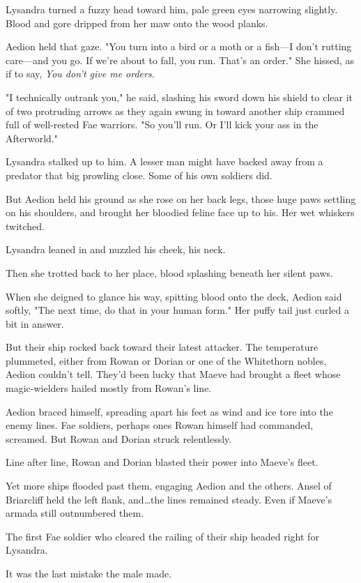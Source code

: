 Lysandra turned a fuzzy head toward him, pale green eyes narrowing slightly.
Blood and gore dripped from her maw onto the wood planks.

Aedion held that gaze.
"You turn into a bird or a moth or a fish---I don't rutting care---and you go.
If we're about to fall, you run.
That's an order."
She hissed, as if to say, \emph{You don't give me orders}.

"I technically outrank you," he said, slashing his sword down his shield to clear it of two protruding arrows as they again swung in toward another ship crammed full of well-rested Fae warriors.
"So you'll run.
Or I'll kick your ass in the Afterworld."

Lysandra stalked up to him.
A lesser man might have backed away from a predator that big prowling close.
Some of his own soldiers did.

But Aedion held his ground as she rose on her back legs, those huge paws settling on his shoulders, and brought her bloodied feline face up to his.
Her wet whiskers twitched.

Lysandra leaned in and nuzzled his cheek, his neck.

Then she trotted back to her place, blood splashing beneath her silent paws.

When she deigned to glance his way, spitting blood onto the deck, Aedion said softly, "The next time, do that in your human form."
Her puffy tail just curled a bit in answer.

But their ship rocked back toward their latest attacker.
The temperature plummeted, either from Rowan or Dorian or one of the Whitethorn nobles, Aedion couldn't tell.
They'd been lucky that Maeve had brought a fleet whose magic-wielders hailed mostly from Rowan's line.

Aedion braced himself, spreading apart his feet as wind and ice tore into the enemy lines.
Fae soldiers, perhaps ones Rowan himself had commanded, screamed.
But Rowan and Dorian struck relentlessly.

Line after line, Rowan and Dorian blasted their power into Maeve's fleet.

Yet more ships flooded past them, engaging Aedion and the others.
Ansel of Briarcliff held the left flank, and\ldots the lines remained steady.
Even if Maeve's armada still outnumbered them.

The first Fae soldier who cleared the railing of their ship headed right for Lysandra.

It was the last mistake the male made.

